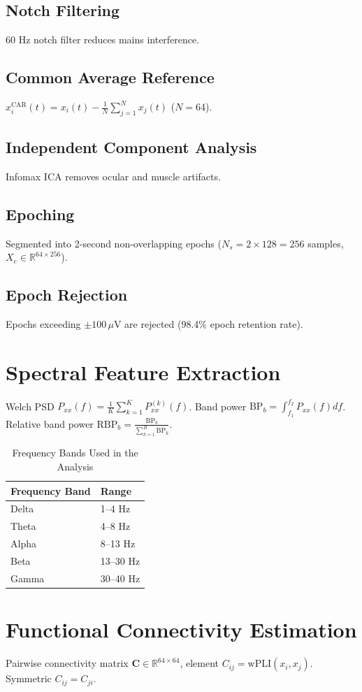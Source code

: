 \documentclass[conference]{IEEEtran}
\begin{document}
\subsection{Notch Filtering} 60 Hz notch filter reduces mains interference.
\subsection{Common Average Reference} $x_i^{\text{CAR}}(t) = x_i(t) - \frac{1}{N} \sum_{j=1}^{N} x_j(t)$ ($N=64$).
\subsection{Independent Component Analysis} Infomax ICA removes ocular and muscle artifacts.
\subsection{Epoching} Segmented into 2-second non-overlapping epochs ($N_s = 2 \times 128 = 256$ samples, $X_e \in \mathbb{R}^{64 \times 256}$).
\subsection{Epoch Rejection} Epochs exceeding $\pm 100\,\mu\text{V}$ are rejected (98.4\% epoch retention rate).

\section{Spectral Feature Extraction}
Welch PSD $P_{xx}(f) = \frac{1}{K} \sum_{k=1}^{K} P_{xx}^{(k)}(f)$. Band power $\text{BP}_b = \int_{f_1}^{f_2} P_{xx}(f) df$. Relative band power $\text{RBP}_b = \frac{\text{BP}_b}{\sum_{k=1}^{B} \text{BP}_k}$.

\begin{table}[h]
\caption{Frequency Bands Used in the Analysis}
\centering
\begin{tabular}{ll}
\toprule
Frequency Band & Range \\
\midrule
Delta & 1--4 Hz \\
Theta & 4--8 Hz \\
Alpha & 8--13 Hz \\
Beta & 13--30 Hz \\
Gamma & 30--40 Hz \\
\bottomrule
\end{tabular}
\end{table}

\section{Functional Connectivity Estimation}
Pairwise connectivity matrix $\mathbf{C} \in \mathbb{R}^{64 \times 64}$, element $C_{ij} = \text{wPLI}(x_i, x_j)$. Symmetric $C_{ij} = C_{ji}$.
\end{document}
